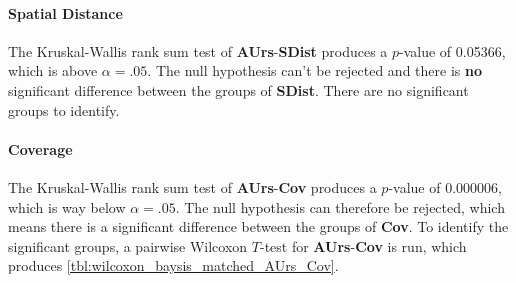 \paragraph{Spatial Distance}
The Kruskal-Wallis rank sum test of \textbf{AUrs}-\textbf{SDist} produces a $p$-value of 0.05366, which is above $\alpha=.05$. The null hypothesis can't be rejected and there is \textbf{no} significant difference between the groups of \textbf{SDist}. There are no significant groups to identify.

\paragraph{Coverage}
The Kruskal-Wallis rank sum test of \textbf{AUrs}-\textbf{Cov} produces a $p$-value of 0.000006, which is way below $\alpha=.05$. The null hypothesis can therefore be rejected, which means there is a significant difference between the groups of \textbf{Cov}. To identify the significant groups, a pairwise Wilcoxon $T$-test for \textbf{AUrs}-\textbf{Cov} is run, which produces \autoref{tbl:wilcoxon_baysis_matched_AUrs_Cov}.
